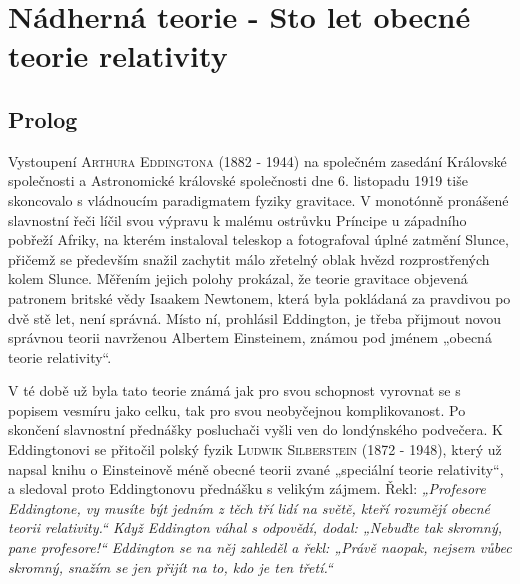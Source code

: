 \setchaptertoc
\chapter{Nádherná teorie - Sto let obecné teorie relativity}\label{feyIchIII}
\section{Prolog}\label{feyIchIIIsecI}
  Vystoupení \textsc{Arthura Eddingtona} (1882 - 1944) na společném zasedání Královské společnosti a
  Astronomické královské společnosti dne 6. listopadu 1919 tiše skoncovalo s vládnoucím paradigmatem
  fyziky gravitace. V monotónně pronášené slavnostní řeči líčil svou výpravu k malému ostrůvku
  Príncipe u západního pobřeží Afriky, na kterém instaloval teleskop a fotografoval úplné zatmění
  Slunce, přičemž se především snažil zachytit málo zřetelný oblak hvězd rozprostřených kolem
  Slunce. Měřením jejich polohy prokázal, že teorie gravitace objevená patronem britské vědy Isaakem
  Newtonem, která byla pokládaná za pravdivou po dvě stě let, není správná. Místo ní, prohlásil
  Eddington, je třeba přijmout novou správnou teorii navrženou Albertem Einsteinem, známou pod
  jménem „obecná teorie relativity“. 

  V té době už byla tato teorie známá jak pro svou schopnost vyrovnat se s popisem vesmíru jako
  celku, tak pro svou neobyčejnou komplikovanost. Po skončení slavnostní přednášky posluchači vyšli
  ven do londýnského podvečera. K Eddingtonovi se přitočil polský fyzik \textsc{Ludwik Silberstein}
  (1872 - 1948), který už napsal knihu o Einsteinově méně obecné teorii zvané „speciální teorie
  relativity“, a sledoval proto Eddingtonovu přednášku s velikým zájmem. Řekl: \emph{„Profesore
  Eddingtone, vy musíte být jedním z těch tří lidí na světě, kteří rozumějí obecné teorii
  relativity.“ Když Eddington váhal s odpovědí, dodal: „Nebuďte tak skromný, pane profesore!“
  Eddington se na něj zahleděl a řekl: „Právě naopak, nejsem vůbec skromný, snažím se jen přijít na
  to, kdo je ten třetí.“} 

